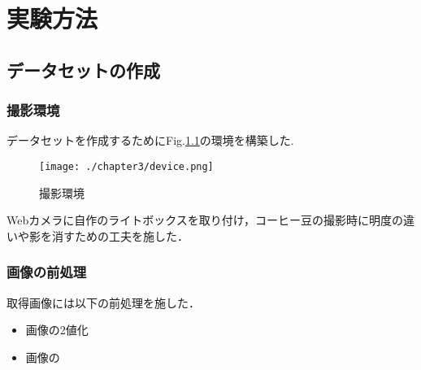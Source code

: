 
\chapter{実験方法}

\section{データセットの作成}
\subsection{撮影環境}
データセットを作成するためにFig.\ref{fig_camera}の環境を構築した.
\begin{figure}[]
  \begin{center}
    \texttt{[image: ./chapter3/device.png]}
    \caption{撮影環境}
    \label{fig_camera}
  \end{center}
\end{figure}
Webカメラに自作のライトボックスを取り付け，コーヒー豆の撮影時に明度の違いや影を消すための工夫を施した．

\subsection{画像の前処理}
取得画像には以下の前処理を施した．
\begin{itemize}
\item 画像の2値化
\item 画像の
\end{itemize}
